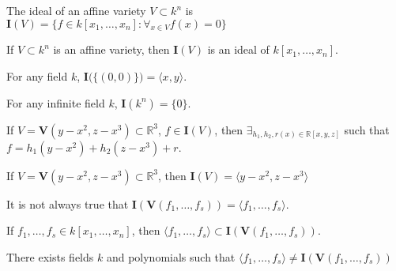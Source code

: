                \begin{definition}
                    The ideal of an affine variety
                    $V\subset k^n$ is
                    $\mathbf{I}(V)%
                     =\{f\in k[x_1,\hdots ,x_n]:\forall_{x\in V}f(x)=0\}$
                \end{definition}
                \begin{theorem}
                    If $V\subset k^n$ is an affine variety,
                    then $\mathbf{I}(V)$ is an ideal of
                    $k[x_1,\hdots ,x_n]$.
                \end{theorem}
                \begin{theorem}
                    For any field $k$,
                    $\mathbf{I}\big(\{(0,0)\}\big)=\langle x,y\rangle$.
                \end{theorem}
                \begin{theorem}
                    For any infinite field $k$,
                    $\mathbf{I}(k^n)=\{0\}$.
                \end{theorem}
                \begin{theorem}
                    If $V=\mathbf{V}(y-x^2,z-x^3)\subset\mathbb{R}^3$,
                    $f\in \mathbf{I}(V)$,
                    then $\exists_{h_1,h_2,r(x)\in\mathbb{R}[x,y,z]}$
                    such that $f=h_1(y-x^2)+h_2(z-x^3)+r$.
                \end{theorem}
                \begin{theorem}
                    If $V=\mathbf{V}(y-x^2,z-x^3)\subset\mathbb{R}^3$,
                    then $\mathbf{I}(V)=\langle y-x^2,z-x^3\rangle$
                \end{theorem}
                \begin{remark}
                    It is not always true that
                    $\mathbf{I}(\mathbf{V}(f_1,\hdots, f_s))%
                     =\langle f_1,\hdots, f_s\rangle$.
                \end{remark}
                \begin{theorem}
                    If $f_1,\hdots, f_s \in k[x_1,\hdots ,x_n]$, then
                    $\langle f_1,\hdots,f_s\rangle%
                     \subset\mathbf{I}(\mathbf{V}(f_1,\hdots, f_s))$.
                \end{theorem}
                \begin{theorem}
                    There exists fields $k$ and polynomials
                    such that
                    $\langle f_1,\hdots,f_s\rangle%
                     \ne\mathbf{I}(\mathbf{V}(f_1,\hdots, f_s))$
                \end{theorem}
